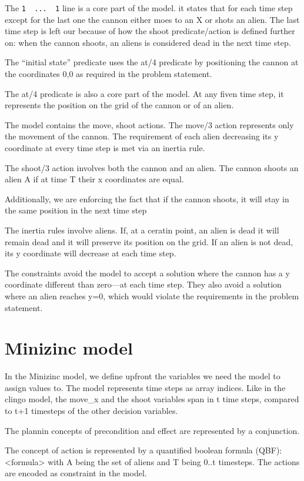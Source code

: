 \documentclass[11pt]{article}
\begin{document}
The \texttt{1 { ...  } 1} line is a core part of the model.
it states that for each time step except for the last one the cannon either moes to an X or shots an alien.
The last time step is left our because of how the shoot predicate/action is defined further on: when the cannon shoots, an aliens is considered dead in the next time step.

The ``initial state'' predicate uses the at/4 predicate by positioning the cannon at the coordinates 0,0 as required in the problem statement.

The at/4 predicate is also a core part of the model.
At any fiven time step, it represents the position on the grid of the cannon or of an alien.

The model contains the move, shoot actions.
The move/3 action represents only the movement of the cannon.
The requirement of each alien decreasing its y coordinate at every time step is met via an inertia rule.

The shoot/3 action involves both the cannon and an alien.
The cannon shoots an alien A if at time T their x coordinates are equal.

Additionally, we are enforcing the fact that if the cannon shoots, it will stay in the same position in the next time step

The inertia rules involve aliens.
If, at a ceratin point, an alien is dead it will remain dead and it will preserve its position on the grid.
If an alien is not dead, its y coordinate will decrease at each time step.

The constraints avoid the model to accept a solution where the cannon has a y coordinate different than zero---at each time step.
They also avoid a solution where an alien reaches y=0, which would violate the requirements in the problem statement.


\section{Minizinc model}

In the Minizinc model, we define upfront the variables we need the model to assign values to.
The model represents time steps as array indices.
Like in the clingo model, the move\_x and the shoot variables span in t time steps, compared to t+1 timesteps of the other decision variables.

The plannin concepts of precondition and effect are represented by a conjunction.

The concept of action is represented by a quantified boolean formula (QBF): <formula> with A being the set of aliens and T being 0..t timesteps.
The actions are encoded as constraint in the model.
\end{document}
